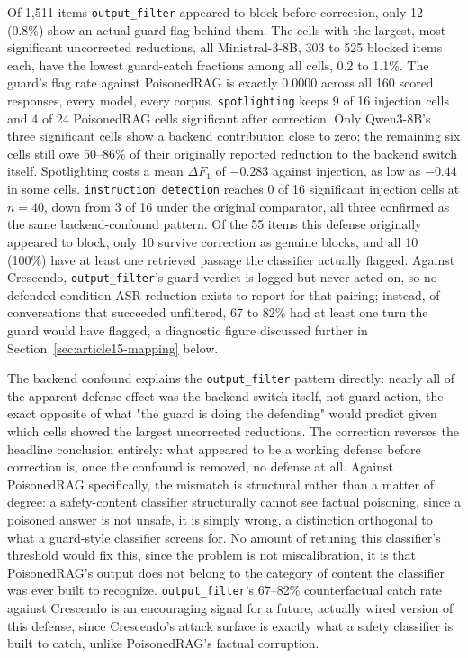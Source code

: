 Of 1,511 items \texttt{output\_filter} appeared to block before
correction, only 12 (0.8\%) show an actual guard flag behind them. The
cells with the largest, most significant uncorrected reductions, all
Ministral-3-8B, 303 to 525 blocked items each, have the lowest
guard-catch fractions among all cells, 0.2 to 1.1\%. The guard's flag
rate against PoisonedRAG is exactly 0.0000 across all 160 scored
responses, every model, every corpus. \texttt{spotlighting} keeps 9 of
16 injection cells and 4 of 24 PoisonedRAG cells significant after
correction. Only Qwen3-8B's three significant cells show a backend
contribution close to zero; the remaining six cells still owe 50--86\%
of their originally reported reduction to the backend switch itself.
Spotlighting costs a mean $\Delta F_1$ of $-0.283$ against injection, as
low as $-0.44$ in some cells. \texttt{instruction\_detection} reaches 0
of 16 significant injection cells at $n=40$, down from 3 of 16 under the
original comparator, all three confirmed as the same backend-confound
pattern. Of the 55 items this defense originally appeared to block, only
10 survive correction as genuine blocks, and all 10 (100\%) have at
least one retrieved passage the classifier actually flagged. Against
Crescendo, \texttt{output\_filter}'s guard verdict is logged but never
acted on, so no defended-condition ASR reduction exists to report for
that pairing; instead, of conversations that succeeded unfiltered, 67 to
82\% had at least one turn the guard would have flagged, a diagnostic
figure discussed further in Section~\ref{sec:article15-mapping} below.

The backend confound explains the \texttt{output\_filter} pattern
directly: nearly all of the apparent defense effect was the backend
switch itself, not guard action, the exact opposite of what "the guard
is doing the defending" would predict given which cells showed the
largest uncorrected reductions. The correction reverses the headline
conclusion entirely: what appeared to be a working defense before
correction is, once the confound is removed, no defense at all. Against
PoisonedRAG specifically, the mismatch is structural rather than a
matter of degree: a safety-content classifier structurally cannot see
factual poisoning, since a poisoned answer is not unsafe, it is simply
wrong, a distinction orthogonal to what a guard-style classifier
screens for. No amount of retuning this classifier's threshold would
fix this, since the problem is not miscalibration, it is that
PoisonedRAG's output does not belong to the category of content the
classifier was ever built to recognize. \texttt{output\_filter}'s
67--82\% counterfactual catch rate against Crescendo is an encouraging
signal for a future, actually wired version of this defense, since
Crescendo's attack surface is exactly what a safety classifier is built
to catch, unlike PoisonedRAG's factual corruption.

